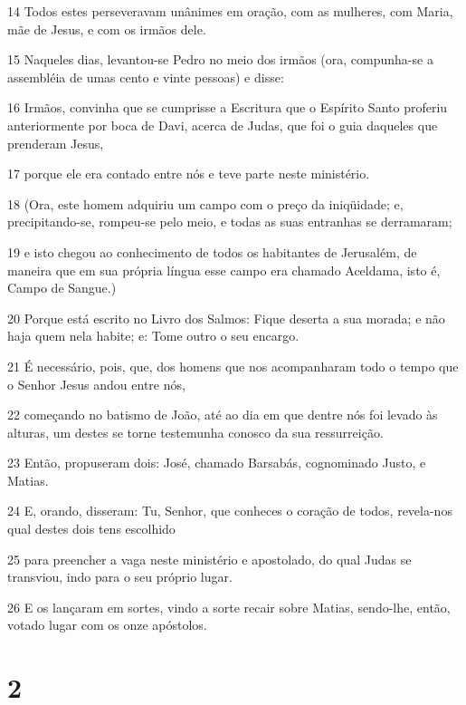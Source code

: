 \par 14 Todos estes perseveravam unânimes em oração, com as mulheres, com Maria, mãe de Jesus, e com os irmãos dele.
\par 15 Naqueles dias, levantou-se Pedro no meio dos irmãos (ora, compunha-se a assembléia de umas cento e vinte pessoas) e disse:
\par 16 Irmãos, convinha que se cumprisse a Escritura que o Espírito Santo proferiu anteriormente por boca de Davi, acerca de Judas, que foi o guia daqueles que prenderam Jesus,
\par 17 porque ele era contado entre nós e teve parte neste ministério.
\par 18 (Ora, este homem adquiriu um campo com o preço da iniqüidade; e, precipitando-se, rompeu-se pelo meio, e todas as suas entranhas se derramaram;
\par 19 e isto chegou ao conhecimento de todos os habitantes de Jerusalém, de maneira que em sua própria língua esse campo era chamado Aceldama, isto é, Campo de Sangue.)
\par 20 Porque está escrito no Livro dos Salmos: Fique deserta a sua morada; e não haja quem nela habite; e: Tome outro o seu encargo.
\par 21 É necessário, pois, que, dos homens que nos acompanharam todo o tempo que o Senhor Jesus andou entre nós,
\par 22 começando no batismo de João, até ao dia em que dentre nós foi levado às alturas, um destes se torne testemunha conosco da sua ressurreição.
\par 23 Então, propuseram dois: José, chamado Barsabás, cognominado Justo, e Matias.
\par 24 E, orando, disseram: Tu, Senhor, que conheces o coração de todos, revela-nos qual destes dois tens escolhido
\par 25 para preencher a vaga neste ministério e apostolado, do qual Judas se transviou, indo para o seu próprio lugar.
\par 26 E os lançaram em sortes, vindo a sorte recair sobre Matias, sendo-lhe, então, votado lugar com os onze apóstolos.

\chapter{2}

